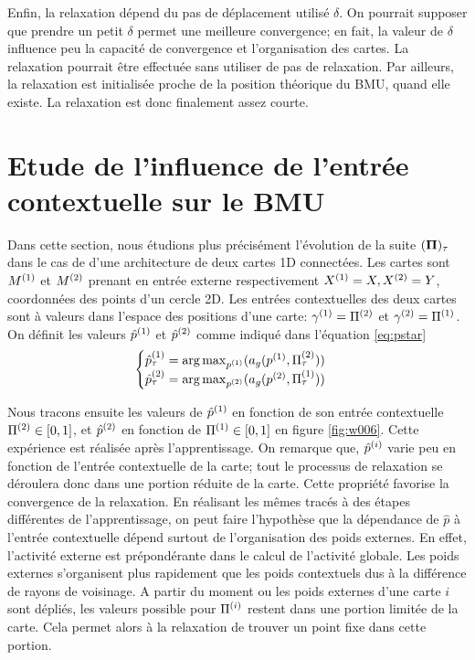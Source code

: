 \documentclass[../main]{subfiles}
\begin{document}
Enfin, la relaxation dépend du pas de déplacement utilisé $\delta$. On pourrait supposer que prendre un petit $\delta$ permet une meilleure convergence; en fait, la valeur de $\delta$ influence peu la capacité de convergence et l'organisation des cartes. La relaxation pourrait être effectuée sans utiliser de pas de relaxation. Par ailleurs, la relaxation est initialisée proche de la position théorique du BMU, quand elle existe. La relaxation est donc finalement assez courte.


\section{Etude de l'influence de l'entrée contextuelle sur le BMU}\label{sec:cont}

Dans cette section, nous étudions plus précisément l'évolution de la suite $(\mathbf{\Pi})_{\tau}$ dans le cas de d'une architecture de deux cartes 1D connectées. Les cartes sont $M^{({1})}$ et $M^{({2})}$ prenant en entrée externe respectivement $X^{({1})} = X, X^{({2})} = Y$, coordonnées des points d'un cercle 2D.
Les entrées contextuelles des deux cartes sont à valeurs dans l'espace des positions d'une carte: $\gamma^{({1})} = \Pi^{({2})}$ et $\gamma^{({2})} = \Pi^{({1})}$.
On définit les valeurs $\hat{p}^{({1})}$ et $\hat{p}^{({2})}$ comme indiqué dans l'équation \ref{eq:pstar}
\begin{equation} 
\begin{cases}
	\hat{p}^{({1})}_{\tau} = \operatorname*{arg\,max}_{p^{({1})}}(a_g(p^{({1})},\Pi^{({2})}_{\tau})) \\
	\hat{p}^{({2})}_{\tau} = \operatorname*{arg\,max}_{p^{({2})}}(a_g(p^{({2})},\Pi^{({1})}_{\tau})) \\
\end{cases}
\end{equation}

Nous tracons ensuite les valeurs de $\hat{p}^{({1})}$ en fonction de son entrée contextuelle $\Pi^{({2})} \in [0,1]$, et $\hat{p}^{({2})}$ en fonction de $\Pi^{({1})} \in [0,1]$ en figure \ref{fig:w006}.
Cette expérience est réalisée après l'apprentissage. On remarque que, $\hat{p}^{({i})}$ varie peu en fonction de l'entrée contextuelle de la carte; tout le processus de relaxation se déroulera donc dans une portion réduite de la carte. Cette propriété favorise la convergence de la relaxation.
En réalisant les mêmes tracés à des étapes différentes de l'apprentissage, on peut faire l'hypothèse que la dépendance de $\hat{p}$ à l'entrée contextuelle dépend surtout de l'organisation des poids externes. En effet, l'activité externe est prépondérante dans le calcul de l'activité globale. Les poids externes s'organisent plus rapidement que les poids contextuels dus à la différence de rayons de voisinage. A partir du moment ou les poids externes d'une carte $i$ sont dépliés, les valeurs possible pour $\Pi^{({i})}$ restent dans une portion limitée de la carte. Cela permet alors à la relaxation de trouver un point fixe dans cette portion.
\end{document}

